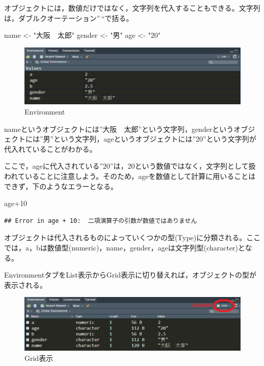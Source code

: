 \documentclass[
]{book}
\newenvironment{Shaded}{\begin{snugshade}}{\end{snugshade}}
\newcommand{\DecValTok}[1]{\textcolor[rgb]{0.00,0.00,0.81}{#1}}
\newcommand{\NormalTok}[1]{#1}
\newcommand{\OtherTok}[1]{\textcolor[rgb]{0.56,0.35,0.01}{#1}}
\newcommand{\SpecialCharTok}[1]{\textcolor[rgb]{0.00,0.00,0.00}{#1}}
\newcommand{\StringTok}[1]{\textcolor[rgb]{0.31,0.60,0.02}{#1}}
\begin{document}
オブジェクトには，数値だけではなく，文字列を代入することもできる。文字列は，ダブルクオーテーション''\,``で括る。

\begin{Shaded}
\begin{Highlighting}[]
\NormalTok{name }\OtherTok{\textless{}{-}} \StringTok{"大阪　太郎"}
\NormalTok{gender }\OtherTok{\textless{}{-}} \StringTok{"男"}
\NormalTok{age }\OtherTok{\textless{}{-}} \StringTok{"20"}
\end{Highlighting}
\end{Shaded}

\begin{figure}
\centering
\includegraphics{moji.png}
\caption{Environment}
\end{figure}

nameというオブジェクトには''大阪　太郎''という文字列，genderというオブジェクトには''男''という文字列，ageというオブジェクトには''20''という文字列が代入れていることがわかる。

ここで，ageに代入されている''20''は，20という数値ではなく，文字列として扱われていることに注意しよう。そのため，ageを数値として計算に用いることはできず，下のようなエラーとなる。

\begin{Shaded}
\begin{Highlighting}[]
\NormalTok{age}\SpecialCharTok{+}\DecValTok{10}
\end{Highlighting}
\end{Shaded}

\begin{verbatim}
## Error in age + 10:  二項演算子の引数が数値ではありません
\end{verbatim}

オブジェクトは代入されるものによっていくつかの型(Type)に分類される。ここでは，a，bは数値型(numeric)，name，gender，ageは文字列型(character)となる。

EnvironmentタブをList表示からGrid表示に切り替えれば，オブジェクトの型が表示される。

\begin{figure}
\centering
\includegraphics{grid.png}
\caption{Grid表示}
\end{figure}
\end{document}
